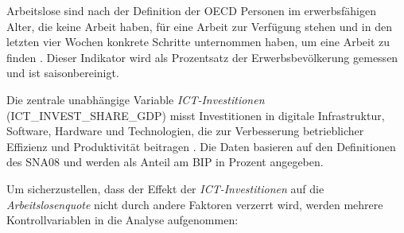 Arbeitslose sind nach der Definition der \ac{OECD} Personen im erwerbsfähigen Alter, die keine 
Arbeit haben, für eine Arbeit zur Verfügung stehen und in den letzten vier Wochen konkrete 
Schritte unternommen haben, um eine Arbeit zu finden \parencite{oecd2022unemployment}. Dieser 
Indikator wird als Prozentsatz der Erwerbsbevölkerung gemessen und ist saisonbereinigt.

Die zentrale unabhängige Variable \textit{\ac{ICT}-Investitionen} (ICT\_INVEST\_SHARE\_GDP) misst 
Investitionen in digitale Infrastruktur, Software, Hardware und Technologien, die zur 
Verbesserung betrieblicher Effizienz und Produktivität beitragen \parencite{oecd2022ict}. Die 
Daten basieren auf den Definitionen des \ac{SNA08} und werden als Anteil am \ac{BIP} in Prozent 
angegeben.

Um sicherzustellen, dass der Effekt der \textit{\ac{ICT}-Investitionen} auf die 
\textit{Arbeitslosenquote} nicht durch andere Faktoren verzerrt wird, werden mehrere 
Kontrollvariablen in die Analyse aufgenommen:


